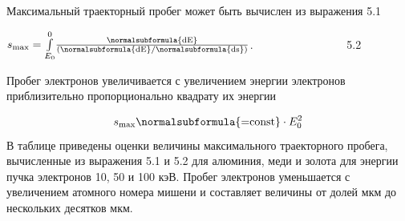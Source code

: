 \documentclass[a4paper,14pt, openany, twoside, draft]{extbook} %
\begin{document}
Максимальный траекторный пробег может быть вычислен из выражения 5.1

 $s_{\text{max}}=\overset 0{\underset{E_0}{\int }}\frac{\normalsubformula{\text{dE}}}{(\normalsubformula{\text{dE}}/\normalsubformula{\text{ds}})}$. \ \ \ \ \ \ \ \ \ \ \ \ \ \ \ \ 5.2

Пробег электронов увеличивается с увеличением энергии электронов приблизительно пропорционально квадрату их энергии

\begin{equation*}
s_{\text{max}}\normalsubformula{\text{=const}}\cdot E_0^2
\end{equation*}
В таблице приведены оценки величины максимального траекторного пробега, вычисленные из выражения 5.1 и 5.2 для алюминия, меди и золота для энергии пучка электронов 10, 50 и 100 кэВ. Пробег электронов уменьшается с увеличением атомного номера мишени и составляет величины от долей мкм до нескольких десятков мкм.
\end{document}
